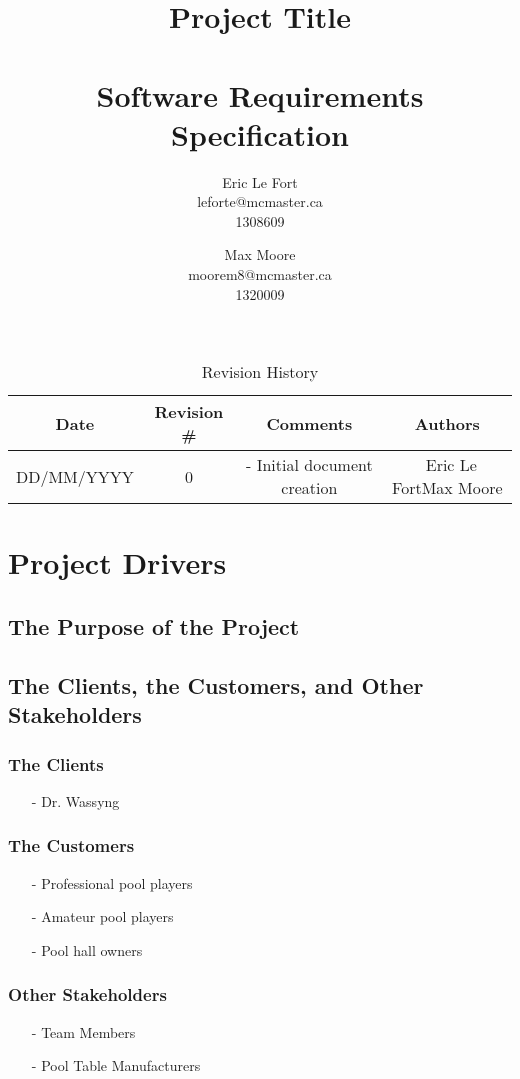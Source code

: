 \documentclass[titlepage]{article}
\title{Project Title\\~\\Software Requirements Specification}
\author{
Eric Le Fort\\leforte@mcmaster.ca\\1308609\and
Max Moore\\moorem8@mcmaster.ca\\1320009
}
\begin{document}
\maketitle


\tableofcontents
\listoffigures
\listoftables


\vfill
\begin{table}[!htbp]
\centering
\begin{tabular}{| C{3} | C{2} | C{5} | C{2.5} |}\hline
	Date			&Revision \#	&Comments						&Authors\\\hline
	DD/MM/YYYY		&0				&- Initial document creation	&~Eric Le Fort\newline Max Moore\\\hline
\end{tabular}
\caption{Revision History}
\end{table}
\newpage


\section{Project Drivers}
\subsection{The Purpose of the Project}

\subsection{The Clients, the Customers, and Other Stakeholders}
\subsubsection{The Clients}
\begin{itemize}
	\item[-] Dr. Wassyng
\end{itemize}

\subsubsection{The Customers}
\begin{itemize}
	\item[-] Professional pool players
	\item[-] Amateur pool players
	\item[-] Pool hall owners
\end{itemize}

\subsubsection{Other Stakeholders}
\begin{itemize}
	\item[-] Team Members
	\item[-] Pool Table Manufacturers
\end{itemize}
\end{document}
